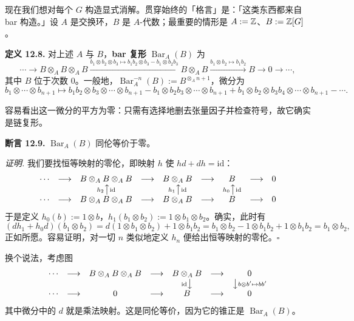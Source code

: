 现在我们想对每个 $G$ 构造显式消解。贯穿始终的「格言」是：「这类东西都来自 bar 构造。」设 $A$ 是交换环，$B$ 是 $A$-代数；最重要的情形是 $A:=\mathbb{Z}$、$B:=\mathbb{Z}[G]$。

\textbf{定义 12.8.} 对上述 $A$ 与 $B$，\textbf{bar 复形} $\operatorname{Bar}_A(B)$ 为
\[
\cdots\to B\otimes_AB\otimes_AB\xrightarrow{b_1\otimes b_2\otimes b_3\mapsto b_1b_2\otimes b_3-b_1\otimes b_2b_3}B\otimes_AB\xrightarrow{b_1\otimes b_2\mapsto b_1b_2}B\to0\to\cdots,
\]
其中 $B$ 位于次数 $0$。一般地，$\operatorname{Bar}^{-n}_A(B):=B^{\otimes_A n+1}$，微分为
\[
b_1\otimes\cdots\otimes b_{n+1}\mapsto b_1b_2\otimes b_3\otimes\cdots\otimes b_{n+1}
-b_1\otimes b_2b_3\otimes\cdots\otimes b_{n+1}
+b_1\otimes b_2\otimes b_3b_4\otimes\cdots\otimes b_{n+1}-\cdots.
\]

容易看出这一微分的平方为零：只需有选择地删去张量因子并检查符号，故它确实是链复形。

\textbf{断言 12.9.} $\operatorname{Bar}_A(B)$ 同伦等价于零。

\textit{证明.} 我们要找恒等映射的零伦，即映射 $h$ 使 $hd+dh=\mathrm{id}$：
\[
\begin{array}{ccccccccc}
\cdots & \longrightarrow & B\otimes_AB\otimes_AB & \longrightarrow & B\otimes_AB & \longrightarrow & B & \longrightarrow & 0\\
& & {\scriptstyle h_2}\big\uparrow{\scriptstyle\mathrm{id}} & & {\scriptstyle h_1}\big\uparrow{\scriptstyle\mathrm{id}} & & {\scriptstyle h_0}\big\uparrow{\scriptstyle\mathrm{id}} & & \\
\cdots & \longrightarrow & B\otimes_AB\otimes_AB & \longrightarrow & B\otimes_AB & \longrightarrow & B & \longrightarrow & 0
\end{array}
\]
于是定义 $h_0(b):=1\otimes b$，$h_1(b_1\otimes b_2):=1\otimes b_1\otimes b_2$。确实，此时有
\[
(dh_1+h_0d)(b_1\otimes b_2)=d(1\otimes b_1\otimes b_2)+1\otimes b_1b_2=b_1\otimes b_2-1\otimes b_1b_2+1\otimes b_1b_2=b_1\otimes b_2,
\]
正如所愿。容易证明，对一切 $n$ 类似地定义 $h_n$ 便给出恒等映射的零伦。\hfill$\square$

换个说法，考虑图
\[
\begin{array}{ccccccc}
\cdots & \longrightarrow & B\otimes_AB\otimes_AB & \longrightarrow & B\otimes_AB & \longrightarrow & 0\\
& & & & {\scriptstyle\mathrm{id}}\big\downarrow & & \big\downarrow{\scriptstyle b\otimes b'\mapsto bb'}\\
\cdots & \longrightarrow & 0 & \longrightarrow & B & \longrightarrow & 0
\end{array}
\]
其中微分中的 $d$ 就是乘法映射。这是同伦等价，因为它的锥正是 $\operatorname{Bar}_A(B)$。


